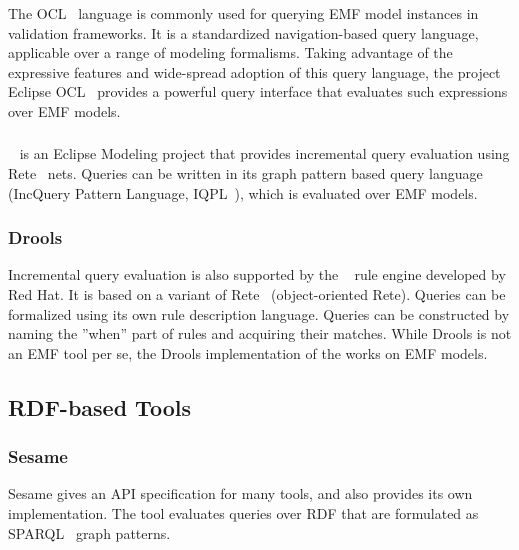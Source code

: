 The OCL~\cite{OCL} language is commonly used for querying EMF model instances in validation frameworks. It is a standardized navigation-based query language, applicable over a range of modeling formalisms. Taking advantage of the expressive features and wide-spread adoption of this query language, the project Eclipse OCL~\cite{EclipseOCL} provides a powerful query interface that evaluates such expressions over EMF models.


\subsubsection{\eiq{}}
\eiq{}~\cite{models10} is an Eclipse Modeling project that provides incremental query evaluation using Rete~\cite{rete} nets. Queries can be written in its graph pattern based query language (IncQuery Pattern Language, IQPL~\cite{iqpl}), which is evaluated over EMF models.

\subsubsection{Drools}
Incremental query evaluation is also supported by the ~\cite{Drools} rule engine developed by Red Hat. It is based on a variant of Rete~\cite{rete} (object-oriented Rete). Queries can be formalized using its own rule description language. Queries can be constructed by naming the ''when'' part of rules and acquiring their matches. While Drools is not an EMF tool per se, the Drools implementation of the \tb{} works on EMF models.


\subsection{RDF-based Tools}

\subsubsection{Sesame}
Sesame gives an API specification for many tools, and also provides its own implementation. The tool evaluates queries over RDF that are formulated as SPARQL~\cite{Sparql} graph patterns.

